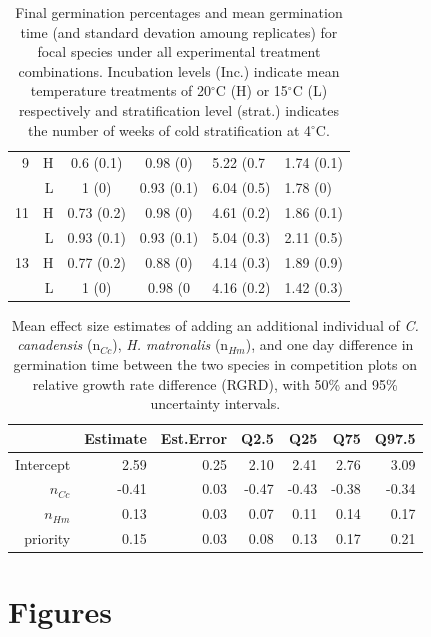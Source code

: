 \documentclass{article}[11pt]
\begin{document}
\begin{table}[hp]
\begin{tabular}{|rr|cc|ll|}
      \hline
   9 & H & 0.6 (0.1) & 0.98 (0) & 5.22 (0.7 & 1.74 (0.1) \\ 
 & L & 1 (0) & 0.93 (0.1) & 6.04 (0.5) & 1.78 (0) \\ 
      \hline
   11 & H & 0.73 (0.2) & 0.98 (0) & 4.61 (0.2) & 1.86 (0.1) \\ 
 & L & 0.93 (0.1) & 0.93 (0.1) & 5.04 (0.3) & 2.11 (0.5) \\ 
      \hline
   13 & H & 0.77 (0.2) & 0.88 (0) & 4.14 (0.3) & 1.89 (0.9) \\ 
 & L & 1 (0) & 0.98 (0 & 4.16 (0.2) & 1.42 (0.3) \\ 
   \hline
\end{tabular}
\caption{Final germination percentages and mean germination time (and standard devation amoung replicates) for focal species under all experimental treatment combinations. Incubation levels (Inc.) indicate mean temperature treatments of 20$^\circ$C (H) or 15$^\circ$C (L) respectively and stratification level (strat.) indicates the number of weeks of cold stratification at 4$^\circ$C.} %
\label{tab:germcomps}
\end{table}

\pagebreak[4]

\begin{table}[hp]
\centering
\begin{tabular}{rrrrrrr}
  \hline
 & Estimate & Est.Error & Q2.5 & Q25 & Q75 & Q97.5 \\ 
  \hline
Intercept & 2.59 & 0.25 & 2.10 & 2.41 & 2.76 & 3.09 \\ 
  $n_{Cc}$ & -0.41 & 0.03 & -0.47 & -0.43 & -0.38 & -0.34 \\ 
  $n_{Hm}$ & 0.13 & 0.03 & 0.07 & 0.11 & 0.14 & 0.17 \\ 
  priority & 0.15 & 0.03 & 0.08 & 0.13 & 0.17 & 0.21 \\ 
   \hline
\end{tabular}
\caption{Mean effect size estimates of adding an additional individual of \textit{C. canadensis} (n$_{Cc}$), \textit{H. matronalis} (n$_{Hm}$), and one day difference in germination time between the two species in competition plots on relative growth rate difference (RGRD), with 50\% and 95\% uncertainty intervals.}
\label{tab:RGRD}
\end{table}

\pagebreak[4]

\section*{Figures}
\end{document}
